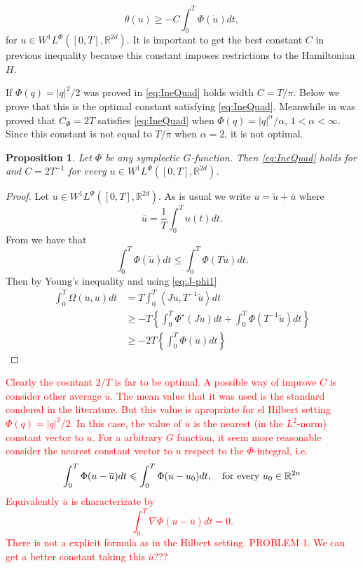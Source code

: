 \documentclass[twoside]{article}
\newtheorem{prop}[thm]{Proposition}
\theoremstyle{remark}
\newcommand{\rr}{\mathbb{R}}
\renewcommand{\leq}{\leqslant}
\renewcommand{\geq}{\geqslant}
\newcommand{\Phie}{\Phi^{\star}}
\begin{document}
\begin{equation}\label{eq:IneQuad}
 \theta(u)\geq -C\int_0^T\Phi\left(\dot{u}\right)dt,
\end{equation}
for $u\in W^1L^{\Phi}([0,T],\rr^{2d})$. It is important to get the best constant $C$ in previous inequality because this constant imposes  restrictions to the Hamiltonian $H$. 

If $\Phi(q)=|q|^2/2$ was proved in \cite[Prop. 3.2]{mawhin2010critical} \eqref{eq:IneQuad} holds width $C=T/\pi$.  Below we prove that this is the optimal constant satisfying \eqref{eq:IneQuad}.   Meanwhile in \cite[Lem. 3.3]{Tian2007192} 
was proved that $C_{\Phi}=2T$ satisfies \eqref{eq:IneQuad} when $\Phi(q)=|q|^{\alpha}/\alpha$, $1<\alpha<\infty$. Since this constant is not equal to $T/\pi$ when $\alpha=2$, it is not optimal.

\begin{prop}
 Let $\Phi$ be any symplectic $G$-function. Then  \eqref{eq:IneQuad} holds for  and $C=2T^{-1}$ for every  $u\in W^1L^{\Phi}([0,T],\rr^{2d})$.
\end{prop}

 \begin{proof} Let  $u\in W^1L^{\Phi}([0,T],\rr^{2d})$. As is usual we write $u=\tilde{u}+\overline{u}$ where
 \[\overline{u}=\frac{1}{T}\int_0^Tu(t)dt.\]
 From \cite[Lem. 2.4]{MA2017} we have that
 \[\int_0^T\Phi(\tilde{u})dt\leq\int_0^T\Phi(T\dot{u})dt.\]
 Then by Young's inequality and using \eqref{eq:J-phi1}
 \[
 \begin{split}
  \int_0^T\Omega\left(\dot{u},u\right)dt &=T\int_0^T\left\langle J\dot{u},T^{-1}\tilde{u}\right\rangle dt\\
  &\geq -T\left\{ \int_0^T\Phie(J\dot{u})dt + \int_0^T\Phi(T^{-1}\tilde{u})dt \right\}\\
  &\geq -2T\left\{ \int_0^T\Phi(\dot{u})dt \right\}
  \end{split}
 \]
 \end{proof}

\textcolor{red}{ Clearly the cosntant $2/T$ is far to be optimal. A possible way of improve $C$ is consider other average $\overline{u}$. The mean value that it was used is the standard condered in the literature. But this value is apropriate for el Hilbert setting $\Phi(q)=|q|^2/2$. In this case, the value of $\overline{u}$ is the nearest (in the $L^2$-norm) constant vector to $u$. For a arbitrary $G$ function, it seem more reasonable consider    the nearest constant vector to $u$ respect to the $\Phi $-integral, i.e.
\[
 \int_0^T\Phi(u-\overline{u})dt\leq \int_0^T\Phi(u-u_0)dt,\quad\hbox{for every } u_0\in\rr^{2n}
\]
Equivalently $\overline{u}$ is characterizate by
\[
 \int_0^T\nabla\Phi(u-\overline{u})dt=0.
\]
There is not a explicit formula as in the Hilbert setting.
\newline
PROBLEM 1. We can get a better constant taking this $\overline{u}$???}
\end{document}
